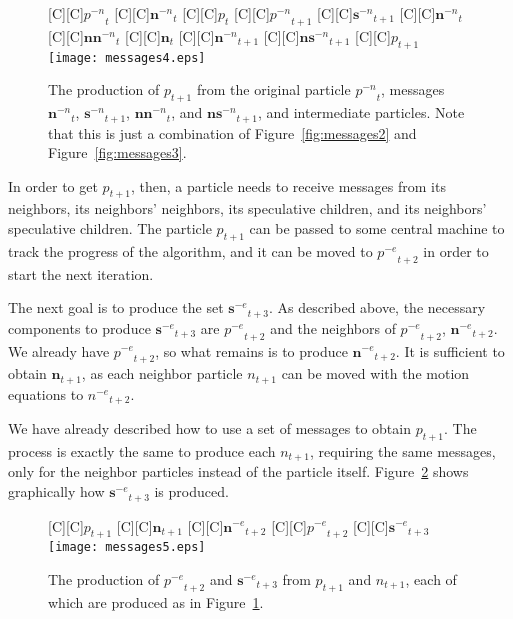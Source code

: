 \documentclass[journal,letterpaper]{IEEEtran}
\newcommand{\fig}[1]{Figure~\ref{fig:#1}}
\providecommand{\noeval}[1]{\ensuremath{#1^{-e}}}
\providecommand{\nonbest}[1]{\ensuremath{#1^{-n}}}
\providecommand{\p}{\ensuremath{p}}
\providecommand{\sset}{\ensuremath{\mathbf{s}}}
\providecommand{\nsset}{\ensuremath{\mathbf{ns}}}
\providecommand{\n}{\ensuremath{n}}
\providecommand{\nset}{\ensuremath{\mathbf{n}}}
\providecommand{\nnset}{\ensuremath{\mathbf{nn}}}
\begin{document}
\begin{figure}
  \centering
  [C][C]{$\nonbest{\p}_{t}$}
  [C][C]{$\nonbest{\nset}_{t}$}
  [C][C]{$\p_{t}$}
  [C][C]{$\nonbest{\p}_{t+1}$}
  [C][C]{$\nonbest{\sset}_{t+1}$}
  [C][C]{$\nonbest{\nset}_{t}$}
  [C][C]{$\nonbest{\nnset}_{t}$}
  [C][C]{$\nset_{t}$}
  [C][C]{$\nonbest{\nset}_{t+1}$}
  [C][C]{$\nonbest{\nsset}_{t+1}$}
  [C][C]{$\p_{t+1}$}
  \texttt{[image: messages4.eps]}
  \caption{The production of $\p_{t+1}$ from the original particle 
  $\nonbest{\p}_{t}$, messages $\nonbest{\nset}_{t}$, $\nonbest{\sset}_{t+1}$,
  $\nonbest{\nnset}_{t}$, and $\nonbest{\nsset}_{t+1}$, and intermediate
  particles.  Note that this is just a combination of \fig{messages2} and
  \fig{messages3}.}
  \label{fig:messages4}
\end{figure}

In order to get $\p_{t+1}$, then, a particle needs to receive messages from its
neighbors, its neighbors' neighbors, its speculative children, and its
neighbors' speculative children.  The particle $\p_{t+1}$ can be passed to some
central machine to track the progress of the algorithm, and it can be moved to
$\noeval{\p}_{t+2}$ in order to start the next iteration.

The next goal is to produce the set $\noeval{\sset}_{t+3}$.  As described
above, the necessary components to produce $\noeval{\sset}_{t+3}$ are
$\noeval{\p}_{t+2}$ and the neighbors of $\noeval{\p}_{t+2}$,
$\noeval{\nset}_{t+2}$.  We already have $\noeval{\p}_{t+2}$, so what remains
is to produce $\noeval{\nset}_{t+2}$.  It is sufficient to obtain
$\nset_{t+1}$, as each neighbor particle $\n_{t+1}$ can be moved with the
motion equations to $\noeval{\n}_{t+2}$.

We have already described how to use a set of messages to obtain $\p_{t+1}$.
The process is exactly the same to produce each $\n_{t+1}$, requiring the same
messages, only for the neighbor particles instead of the particle itself.
\fig{messages5} shows graphically how $\noeval{\sset}_{t+3}$ is produced.

\begin{figure}
  \centering
  [C][C]{$\p_{t+1}$}
  [C][C]{$\nset_{t+1}$}
  [C][C]{$\noeval{\nset}_{t+2}$}
  [C][C]{$\noeval{\p}_{t+2}$}
  [C][C]{$\noeval{\sset}_{t+3}$}
  \texttt{[image: messages5.eps]}
  \caption{The production of $\noeval{\p}_{t+2}$ and $\noeval{\sset}_{t+3}$
  from $\p_{t+1}$ and $\n_{t+1}$, each of which are produced as in
  \fig{messages4}.}
  \label{fig:messages5}
\end{figure}
\end{document}
